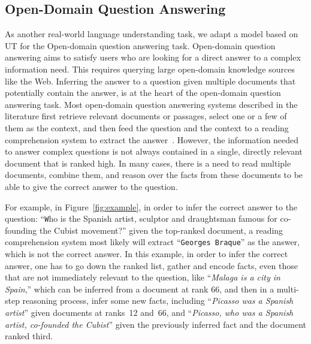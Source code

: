 \subsection{Open-Domain Question Answering}
As another real-world language understanding task, we adapt a model based on UT for the Open-domain question answering task.
Open-domain question answering aims to satisfy users who are looking for a direct answer to a complex information need. 
This requires querying large open-domain knowledge sources like the Web. 
Inferring the answer to a question given multiple documents that potentially contain the answer, is at the heart of the open-domain question answering task. 
Most open-domain question answering systems described in the literature first retrieve relevant documents or passages, select one or a few of them as the context, and then feed the question and the context to a reading comprehension system to extract the answer~\citep{buck2017ask, chen2017reading, seo2016bidirectional, dhingra2016gated}. 
However, the information needed to answer complex questions is not always contained in a single, directly relevant document that is ranked high. In many cases, there is a need to read multiple documents, combine them, and reason over the facts from these documents to be able to give the correct answer to the question.

For example, in Figure~\ref{fig:example}, in order to infer the correct answer to the question: ``{\texttt Who is the Spanish artist, sculptor and draughtsman famous for co-founding the Cubist movement?}'' given the top-ranked document, a reading comprehension system most likely will extract ``\texttt{Georges Braque}'' as the answer, which is not the correct answer. 
In this example, in order to infer the correct answer, one has to go down the ranked list, gather and encode facts, even those that are not immediately relevant to the question, like ``\emph{Malaga is a city in Spain},'' which can be inferred from a document at rank 66, and then in a multi-step reasoning process, infer some new facts, including ``\emph{Picasso was a Spanish artist}'' given documents at ranks~12 and~66, and ``\emph{Picasso, who was a Spanish artist, co-founded the Cubist}'' given the previously inferred fact and the document ranked third. 

